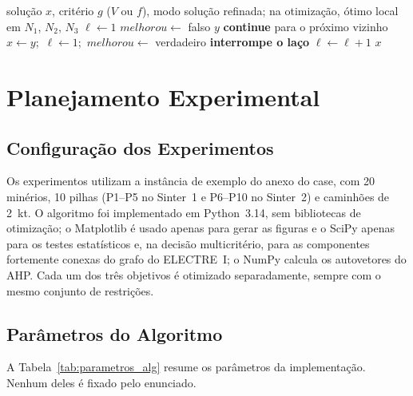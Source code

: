 \documentclass[conference]{IEEEtran}
\begin{document}
\begin{algorithm}[!t]
\caption{Busca local VND}
\label{alg:vnd}
\begin{algorithmic}[1]
\Require solução $x$, critério $g$ ($V$ ou $f$), modo
\Ensure solução refinada; na otimização, ótimo local em $N_1$, $N_2$, $N_3$
\State $\ell \gets 1$
    \State $melhorou \gets$ falso
            \State \Return $y$
        \EndIf
            \State \textbf{continue} para o próximo vizinho
        \EndIf
            \State $x \gets y$;\ $\ell \gets 1$;\ $melhorou \gets$ verdadeiro
            \State \textbf{interrompe o laço}
        \EndIf
    \EndFor
     \State $\ell \gets \ell + 1$ \EndIf
\EndWhile
\State \Return $x$
\end{algorithmic}
\end{algorithm}

\section{Planejamento Experimental}\label{sec:planejamento}

\subsection{Configuração dos Experimentos}

Os experimentos utilizam a instância de exemplo do anexo do case, com 20 minérios, 10 pilhas (P1--P5 no Sinter~1 e P6--P10 no Sinter~2) e caminhões de 2~kt. O algoritmo foi implementado em Python~3.14, sem bibliotecas de otimização; o Matplotlib é usado apenas para gerar as figuras e o SciPy apenas para os testes estatísticos e, na decisão multicritério, para as componentes fortemente conexas do grafo do ELECTRE~I; o NumPy calcula os autovetores do AHP. Cada um dos três objetivos é otimizado separadamente, sempre com o mesmo conjunto de restrições.

\subsection{Parâmetros do Algoritmo}

A Tabela~\ref{tab:parametros_alg} resume os parâmetros da implementação. Nenhum deles é fixado pelo enunciado.
\end{document}
